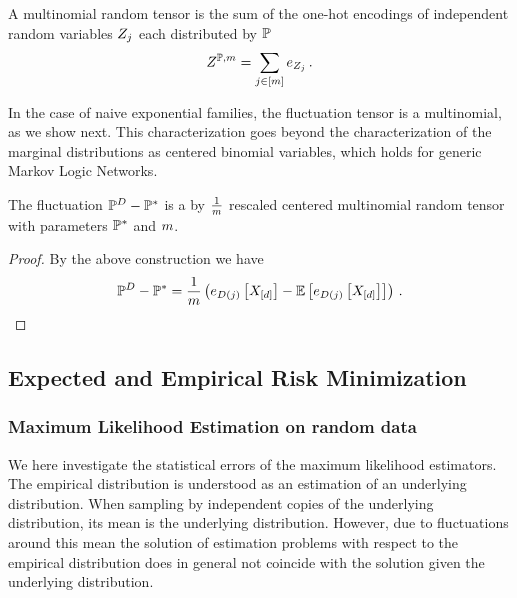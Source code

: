 \begin{definition}\label{def:mulinomialVariable}
	A multinomial random tensor is the sum of the one-hot encodings of independent random variables $Z_j$ each distributed by $\mathbb{P}$
		\[ Z^{\mathbb{P}, m} = \sum_{j\in[m]} e_{Z_j} \, . \]
\end{definition}

In the case of naive exponential families, the fluctuation tensor is a multinomial, as we show next.
This characterization goes beyond the characterization of the marginal distributions as centered binomial variables, which holds for generic Markov Logic Networks.

\begin{lemma}\label{lem:multinomialEmpdistFluctuation}
	The fluctuation $\mathbb{P}^{D} - \mathbb{P}^*$ is a by $\frac{1}{m}$ rescaled centered multinomial random tensor with parameters $\mathbb{P}^*$ and $m$. %
\end{lemma}
\begin{proof}
	By the above construction we have
		\[  \mathbb{P}^{D} - \mathbb{P}^* 
		= \frac{1}{m} \left( e_{D(j)}\left[X_{[d]}\right] - \mathbb{E}\left[e_{D(j)}\left[X_{[d]}\right]\right] \right) \, .  \]
\end{proof}





\subsection{Expected and Empirical Risk Minimization}


\subsubsection{Maximum Likelihood Estimation on random data}

We here investigate the statistical errors of the maximum likelihood estimators.
The empirical distribution is understood as an estimation of an underlying distribution.
When sampling by independent copies of the underlying distribution, its mean is the underlying distribution.
However, due to fluctuations around this mean the solution of estimation problems with respect to the empirical distribution does in general not coincide with the solution given the underlying distribution.

